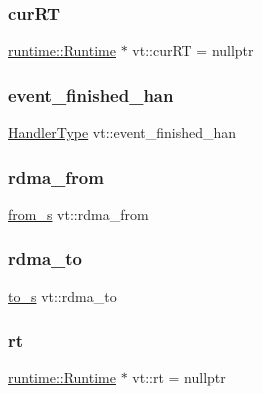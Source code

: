 \subsubsection{\texorpdfstring{cur\+RT}{curRT}}
{\footnotesize\ttfamily \hyperlink{structvt_1_1runtime_1_1_runtime}{runtime\+::\+Runtime} $\ast$ vt\+::cur\+RT = nullptr}

\mbox{\label{namespacevt_a570bc5403031e45a957476ffae6f67c1}} 
\subsubsection{\texorpdfstring{event\+\_\+finished\+\_\+han}{event\_finished\_han}}
{\footnotesize\ttfamily \hyperlink{namespacevt_af64846b57dfcaf104da3ef6967917573}{Handler\+Type} vt\+::event\+\_\+finished\+\_\+han}

\mbox{\label{namespacevt_ae446ed1f5bb8bba34af5c747ea1f244d}} 
\subsubsection{\texorpdfstring{rdma\+\_\+from}{rdma\_from}}
{\footnotesize\ttfamily \hyperlink{structvt_1_1from__s}{from\+\_\+s} vt\+::rdma\+\_\+from}

\mbox{\label{namespacevt_a627aea388cdbf2818bf1393dca90938e}} 
\subsubsection{\texorpdfstring{rdma\+\_\+to}{rdma\_to}}
{\footnotesize\ttfamily \hyperlink{structvt_1_1to__s}{to\+\_\+s} vt\+::rdma\+\_\+to}

\mbox{\label{namespacevt_acce65ec10b513659274e722365aaa36d}} 
\subsubsection{\texorpdfstring{rt}{rt}}
{\footnotesize\ttfamily \hyperlink{structvt_1_1runtime_1_1_runtime}{runtime\+::\+Runtime} $\ast$ vt\+::rt = nullptr}

